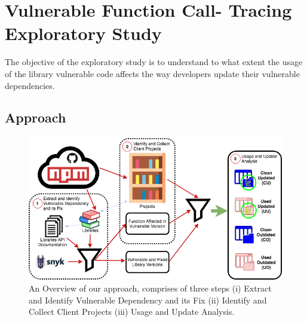 \chapter{Vulnerable Function Call- Tracing Exploratory Study}
\label{sec:exploratory_study}

The objective of the exploratory study is to understand to what extent the usage of the library vulnerable code affects the way developers update their vulnerable dependencies.

\section{Approach}
\begin{figure}[ht]
\centering
\includegraphics[width=1\textwidth]{images/exploratory_approach.png}
\caption{An Overview of our approach, comprises of three steps (i) Extract and Identify Vulnerable Dependency and its Fix (ii) Identify and Collect Client Projects (iii) Usage and Update Analysis.}
\label{fig:example}
\end{figure}


